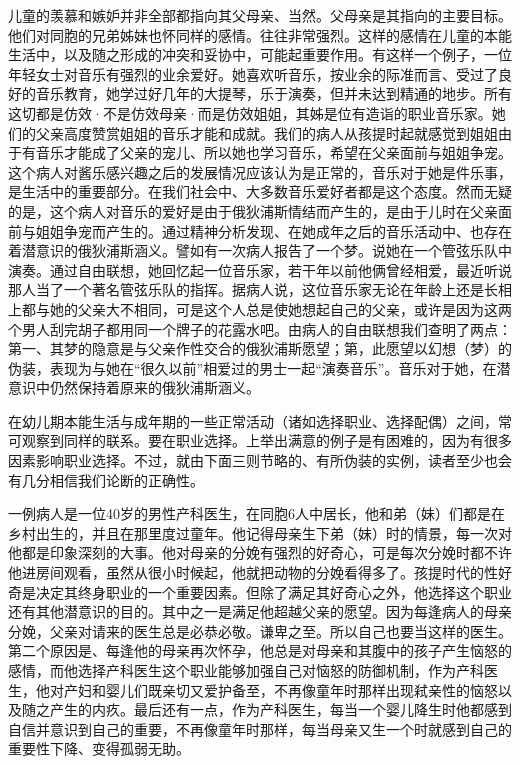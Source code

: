 \documentclass[UTF8,10pt,a4paper,openany]{book}
\begin{document}
儿童的羡慕和嫉妒并非全部都指向其父母亲、当然。父母亲是其指向的主要目标。他们对同胞的兄弟姊妹也怀同样的感情。往往非常强烈。这样的感情在儿童的本能生活中，以及随之形成的冲突和妥协中，可能起重要作用。有这样一个例子，一位年轻女士对音乐有强烈的业余爱好。她喜欢听音乐，按业余的际准而言、受过了良好的音乐教育，她学过好几年的大提琴，乐于演奏，但并未达到精通的地步。所有这切都是仿效·不是仿效母亲·而是仿效姐姐，其姊是位有造诣的职业音乐家。她们的父亲高度赞赏姐姐的音乐才能和成就。我们的病人从孩提时起就感觉到姐姐由于有音乐才能成了父亲的宠儿、所以她也学习音乐，希望在父亲面前与姐姐争宠。这个病人对酱乐感兴趣之后的发展情况应该认为是正常的，音乐对于她是件乐事，是生活中的重要部分。在我们社会中、大多数音乐爱好者都是这个态度。然而无疑的是，这个病人对音乐的爱好是由于俄狄浦斯情结而产生的，是由于儿时在父亲面前与姐姐争宠而产生的。通过精神分析发现、在她成年之后的音乐活动中、也存在着潜意识的俄狄浦斯涵义。譬如有一次病人报告了一个梦。说她在一个管弦乐队中演奏。通过自由联想，她回忆起一位音乐家，若干年以前他俩曾经相爱，最近听说那人当了一个著名管弦乐队的指挥。据病人说，这位音乐家无论在年龄上还是长相上都与她的父亲大不相同，可是这个人总是使她想起自己的父亲，或许是因为这两个男人刮完胡子都用同一个牌子的花露水吧。由病人的自由联想我们查明了两点：第一、其梦的隐意是与父亲作性交合的俄狄浦斯愿望；第，此愿望以幻想（梦）的伪装，表现为与她在“很久以前”相爱过的男士一起“演奏音乐”。音乐对于她，在潜意识中仍然保持着原来的俄狄浦斯涵义。

在幼儿期本能生活与成年期的一些正常活动（诸如选择职业、选择配偶）之间，常可观察到同样的联系。要在职业选择。上举出满意的例子是有困难的，因为有很多因素影响职业选择。不过，就由下面三则节略的、有所伪装的实例，读者至少也会有几分相信我们论断的正确性。

一例病人是一位40岁的男性产科医生，在同胞6人中居长，他和弟（妹）们都是在乡村出生的，并且在那里度过童年。他记得母亲生下弟（妹）时的情景，每一次对他都是印象深刻的大事。他对母亲的分娩有强烈的好奇心，可是每次分娩时都不许他进房间观看，虽然从很小时候起，他就把动物的分娩看得多了。孩提时代的性好奇是决定其终身职业的一个重要因素。但除了满足其好奇心之外，他选择这个职业还有其他潜意识的目的。其中之一是满足他超越父亲的愿望。因为每逢病人的母亲分娩，父亲对请来的医生总是必恭必敬。谦卑之至。所以自己也要当这样的医生。第二个原因是、每逢他的母亲再次怀孕，他总是对母亲和其腹中的孩子产生恼怒的感情，而他选择产科医生这个职业能够加强自己对恼怒的防御机制，作为产科医生，他对产妇和婴儿们既亲切又爱护备至，不再像童年时那样出现弒亲性的恼怒以及随之产生的内疚。最后还有一点，作为产科医生，每当一个婴儿降生时他都感到自信并意识到自己的重要，不再像童年时那样，每当母亲又生一个时就感到自己的重要性下降、变得孤弱无助。
\end{document}
